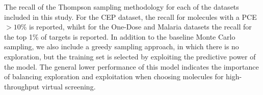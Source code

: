 The recall of the Thompson sampling methodology for each of the datasets included in this study.  For the CEP dataset, the recall for molecules with a PCE $>10\%$ is reported, whilst for the One-Dose and Malaria datasets the recall for the top 1\% of targets is reported.  In addition to the baseline Monte Carlo sampling, we also include a greedy sampling approach, in which there is no exploration, but the training set is selected by exploiting the predictive power of the model.  The general lower performance of this model indicates the importance of balancing exploration and exploitation when choosing molecules for high-throughput virtual screening.\label{fig:thompson_1pc}